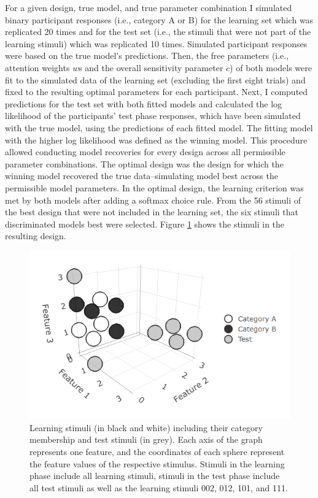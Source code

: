 \documentclass[a4paper,man,natbib]{apa6}
\begin{document}
For a given design, true model, and true parameter combination I simulated binary participant responses (i.e., category A or B) for the learning set which was replicated 20 times and for the test set (i.e., the stimuli that were not part of the learning stimuli) which was replicated 10 times. Simulated participant responses were based on the true model's predictions. Then, the free parameters (i.e., attention weights $w$s and the overall sensitivity parameter $c$) of both models were fit to the simulated data of the learning set (excluding the first eight trials) and fixed to the resulting optimal parameters for each participant. Next, I computed predictions for the test set with both fitted models and calculated the log likelihood of the participants' test phase responses, which have been simulated with the true model, using the predictions of each fitted model. The fitting model with the higher log likelihood was defined as the winning model. This procedure allowed conducting model recoveries for every design across all permissible parameter combinations. The optimal design was the design for which the winning model recovered the true data--simulating model best across the permissible model parameters. In the optimal design, the learning criterion was met by both models after adding a softmax choice rule. From the 56 stimuli of the best design that were not included in the learning set, the six stimuli that discriminated models best were selected. Figure \ref{fig:environment} shows the stimuli in the resulting design.

\begin{figure}
\centering
\includegraphics[width = \textwidth]{fig_environment.png}
\caption{Learning stimuli (in black and white) including their category membership and test stimuli (in grey). Each axis of the graph represents one feature, and the coordinates of each sphere represent the feature values of the respective stimulus. Stimuli in the learning phase include all learning stimuli, stimuli in the test phase include all test stimuli as well as the learning stimuli 002, 012, 101, and 111.}
\label{fig:environment}
\end{figure}
\end{document}
